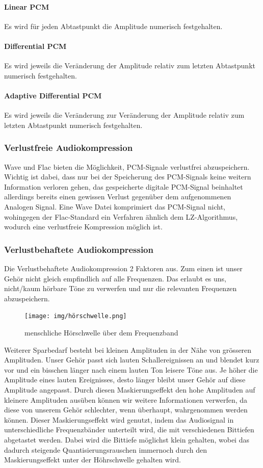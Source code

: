\documentclass{article}
\begin{document}
\paragraph{Linear PCM}
Es wird für jeden Abtastpunkt die Amplitude numerisch festgehalten.
\paragraph{Differential PCM}
Es wird jeweils die Veränderung der Amplitude relativ zum letzten Abtastpunkt numerisch festgehalten.
\paragraph{Adaptive Differential PCM}
Es wird jeweils die Veränderung zur Veränderung der Amplitude relativ zum letzten Abtastpunkt numerisch festgehalten.

\subsubsection{Verlustfreie Audiokompression}
Wave und Flac bieten die Möglichkeit, PCM-Signale verlustfrei abzuspeichern. Wichtig ist dabei, dass nur bei der Speicherung des PCM-Signals keine weitern Information verloren gehen, das gespeicherte digitale PCM-Signal beinhaltet allerdings bereits einen gewissen Verlust gegenüber dem aufgenommenen Analogen Signal. Eine Wave Datei komprimiert das PCM-Signal nicht, wohingegen der Flac-Standard ein Verfahren ähnlich dem LZ-Algorithmus, wodurch eine verlustfreie Kompression möglich ist.
\subsubsection{Verlustbehaftete Audiokompression}
Die Verlustbehaftete Audiokompression 2 Faktoren aus. Zum einen ist unser Gehör nicht gleich empfindlich auf alle Frequenzen. Das erlaubt es uns, nicht/kaum hörbare Töne zu verwerfen und nur die relevanten Frequenzen abzuspeichern.
\begin{figure}[h]
		\begin{center}
		\texttt{[image: img/hörschwelle.png]}
		\end{center}
		\caption{menschliche Hörschwelle über dem Frequenzband}
		\label{fig:menschliche Hörschwelle über dem Frequenzband}
\end{figure}
\newline
Weiterer Sparbedarf besteht bei kleinen Amplituden in der Nähe von grösseren Amplituden. Unser Gehör passt sich lauten Schallereignissen an und blendet kurz vor und ein bisschen länger nach einem lauten Ton leisere Töne aus. Je höher die Amplitude eines lauten Ereignisses, desto länger bleibt unser Gehör auf diese Amplitude angepasst. Durch diesen Maskierungseffekt den hohe Amplituden auf kleinere Amplituden ausüben können wir weitere Informationen verwerfen, da diese von unserem Gehör schlechter, wenn überhaupt, wahrgenommen werden können. Dieser Maskierungseffekt wird genutzt, indem das Audiosignal in unterschiedliche Frequenzbänder unterteilt wird, die mit verschiedenen Bittiefen abgetastet werden. Dabei wird die Bittiefe möglichst klein gehalten, wobei das dadurch steigende Quantisierungsrauschen immernoch durch den Maskierungseffekt unter der Höhrschwelle gehalten wird.  
\end{document}
